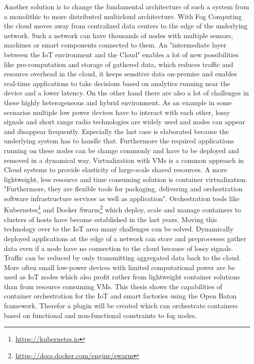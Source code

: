 Another solution is to change the fundamental architecture of such a system from a monolithic to more distributed multicloud architecture.
With Fog Computing the cloud moves away from centralized data centers to the edge of the underlying network.\cite[cf.][p. 380]{Pahl:2015}
Such a network can have thousands of nodes with multiple sensors, machines or smart components connected to them.
An "intermediate layer between the IoT environment and the Cloud"\cite[p.236]{Brito:2016} enables a lot of new possibilities like pre-computation and storage of gathered data, which reduces traffic and resource overhead in the cloud, it keeps sensitive data on-premise\cite[cf.][p.236]{Brito:2016} and enables real-time applications to take decisions based on analytics running near the device and a lower latency.
On the other hand there are also a lot of challenges in these highly heterogeneous and hybrid environment.
As an example in some scenarios multiple low power devices have to interact with each other, lossy signals and short range radio technologies are widely used and nodes can appear and disappear frequently.\cite[cf.][p. 325]{Yannuzzi:2014}
Especially the last case is elaborated because the underlying system has to handle that.
Furthermore the required applications running on these nodes can be change commonly and have to be deployed and removed in a dynamical way.
Virtualization with \acp{VM} is a common approach in Cloud systems to provide elasticity of large-scale shared resources.\cite[cf.][p. 117]{Pahl:2016}
A more lightweight, less resource and time consuming solution is container virtualization.
"Furthermore, they are flexible tools for packaging, delivering and orchestration software infrastructure services as well as application"\cite[p. 117]{Pahl:2016}.
Orchestration tools like Kubernetes\footnote{\url{https://kubernetes.io}} and Docker Swarm\footnote{\url{https://docs.docker.com/engine/swarm}} which deploy, scale and manage containers to clusters of hosts have become established in the last years.
Moving this technology over to the \ac{IoT} area many challenges can be solved.
Dynamically deployed applications at the edge of a network can store and preprocesses gather data even if a node have no connection to the cloud because of lossy signals.
Traffic can be reduced by only transmitting aggregated data back to the cloud.
More often small low-power devices with limited computational power are be used as \ac{IoT} nodes which also profit rather from lightweight container solutions than from resource consuming \acp{VM}.
This thesis shows the capabilities of container orchestration for the \ac{IoT} and smart factories using the Open Baton framework.
Therefor a plugin will be created which can orchestrate containers based on functional and non-functional constraints to fog nodes.


